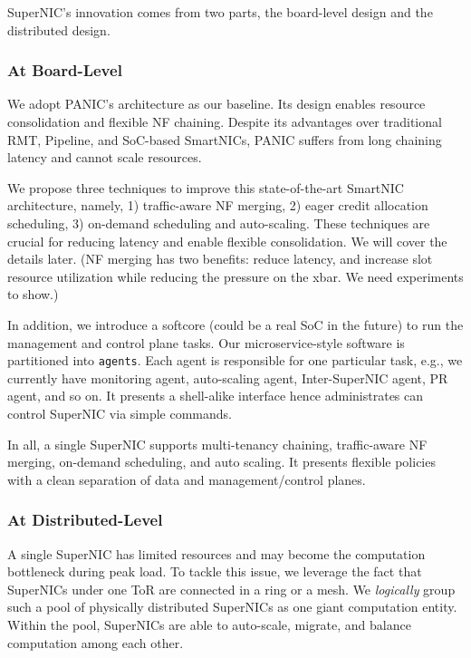 SuperNIC's innovation comes from two parts, the board-level design and the distributed design.

\subsubsection{At Board-Level}

We adopt PANIC’s architecture as our baseline.
Its design enables resource consolidation and flexible NF chaining.
Despite its advantages over traditional RMT, Pipeline, and SoC-based SmartNICs, PANIC suffers from long chaining latency and cannot scale resources.

We propose three techniques to improve this state-of-the-art SmartNIC architecture, namely, 1) traffic-aware NF merging, 2) eager credit allocation scheduling, 3) on-demand scheduling and auto-scaling. These techniques are crucial for reducing latency and enable flexible consolidation. We will cover the details later. (NF merging has two benefits: reduce latency, and increase slot resource utilization while reducing the pressure on the xbar. We need experiments to show.)

In addition, we introduce a softcore (could be a real SoC in the future)
to run the management and control plane tasks.
Our microservice-style software is partitioned into \texttt{agents}.
Each agent is responsible for one particular task, e.g., we currently have monitoring agent, auto-scaling agent, Inter-SuperNIC agent, PR agent, and so on.
It presents a shell-alike interface hence administrates can control SuperNIC via simple commands. 

In all, a single SuperNIC supports multi-tenancy chaining,
traffic-aware NF merging, on-demand scheduling, and auto scaling.
It presents flexible policies with a clean separation of data and management/control planes.

\subsubsection{At Distributed-Level}

A single SuperNIC has limited resources and may become the computation bottleneck during peak load.
To tackle this issue, we leverage the fact that SuperNICs under one ToR are
connected in a ring or a mesh.
We \textit{logically} group such a pool of physically distributed SuperNICs as one giant computation entity.
Within the pool, SuperNICs are able to auto-scale, migrate, and balance computation among each other.

